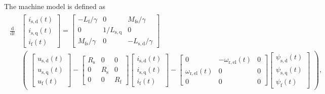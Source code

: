 \begin{solutionblock}
    
    The machine model is defined as
    \begin{align}
        \begin{split}
        \frac{\mathrm{d}}{\mathrm{d}t}
        &
        \begin{bmatrix}
            i_{\mathrm{s,d}}(t) \\
            i_{\mathrm{s,q}}(t) \\
            i_{\mathrm{f}}(t)
        \end{bmatrix}
        =
        \begin{bmatrix}
            -L_{\mathrm{f}}/\gamma  & 0 & M_{\mathrm{fs}}/\gamma \\
            0                       & 1/L_{\mathrm{s,q}}  & 0 \\
            M_{\mathrm{fs}}/\gamma  & 0 & -L_{\mathrm{s,d}}/\gamma 
        \end{bmatrix} \\
        &
        \begin{pmatrix}
            \begin{bmatrix}
                u_{\mathrm{s,d}}(t) \\
                u_{\mathrm{s,q}}(t) \\
                u_{\mathrm{f}}(t)
            \end{bmatrix}
            -
            \begin{bmatrix}
                R_{\mathrm{s}}  & 0 & 0 \\
                0 & R_{\mathrm{s}} & 0 \\
                0 & 0 & R_{\mathrm{f}}
            \end{bmatrix}
            \begin{bmatrix}
                i_{\mathrm{s,d}}(t) \\
                i_{\mathrm{s,q}}(t) \\
                i_{\mathrm{f}}(t)
            \end{bmatrix}
            -
            \begin{bmatrix}
                0 & -\omega_{\mathrm{r,el}}(t) & 0 \\
                \omega_{\mathrm{r,el}}(t) & 0 & 0 \\
                0 & 0 & 0
            \end{bmatrix}
            \begin{bmatrix}
                \psi_{\mathrm{s,d}}(t) \\
                \psi_{\mathrm{s,q}}(t) \\
                \psi_{\mathrm{f}}(t)
            \end{bmatrix}
        \end{pmatrix},
        \label{eq:model_sm}
    \end{split}
    \end{align}


\end{solutionblock}
